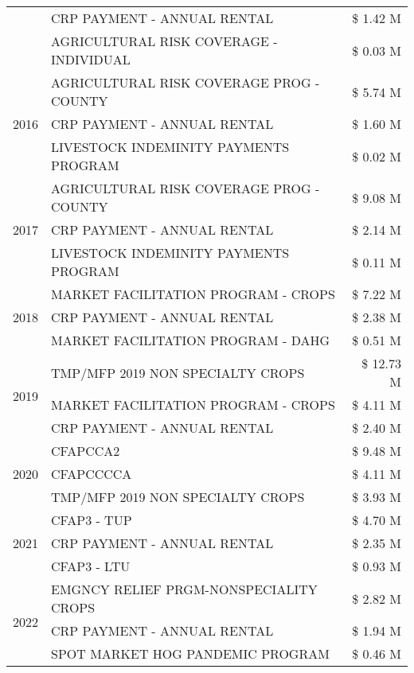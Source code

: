 \begin{tabular}{llr}
 & CRP PAYMENT - ANNUAL RENTAL & \$ 1.42 M \\
 & AGRICULTURAL RISK COVERAGE - INDIVIDUAL & \$ 0.03 M \\
\cline{1-3}
\multirow[t]{3}{*}{2016} & AGRICULTURAL RISK COVERAGE PROG - COUNTY & \$ 5.74 M \\
 & CRP PAYMENT - ANNUAL RENTAL & \$ 1.60 M \\
 & LIVESTOCK INDEMINITY PAYMENTS PROGRAM & \$ 0.02 M \\
\cline{1-3}
\multirow[t]{3}{*}{2017} & AGRICULTURAL RISK COVERAGE PROG - COUNTY & \$ 9.08 M \\
 & CRP PAYMENT - ANNUAL RENTAL & \$ 2.14 M \\
 & LIVESTOCK INDEMINITY PAYMENTS PROGRAM & \$ 0.11 M \\
\cline{1-3}
\multirow[t]{3}{*}{2018} & MARKET FACILITATION PROGRAM - CROPS & \$ 7.22 M \\
 & CRP PAYMENT - ANNUAL RENTAL & \$ 2.38 M \\
 & MARKET FACILITATION PROGRAM - DAHG & \$ 0.51 M \\
\cline{1-3}
\multirow[t]{3}{*}{2019} & TMP/MFP 2019 NON SPECIALTY CROPS & \$ 12.73 M \\
 & MARKET FACILITATION PROGRAM - CROPS & \$ 4.11 M \\
 & CRP PAYMENT - ANNUAL RENTAL & \$ 2.40 M \\
\cline{1-3}
\multirow[t]{3}{*}{2020} & CFAPCCA2 & \$ 9.48 M \\
 & CFAPCCCCA & \$ 4.11 M \\
 & TMP/MFP 2019 NON SPECIALTY CROPS & \$ 3.93 M \\
\cline{1-3}
\multirow[t]{3}{*}{2021} & CFAP3 - TUP & \$ 4.70 M \\
 & CRP PAYMENT - ANNUAL RENTAL & \$ 2.35 M \\
 & CFAP3 - LTU & \$ 0.93 M \\
\cline{1-3}
\multirow[t]{3}{*}{2022} & EMGNCY RELIEF PRGM-NONSPECIALITY CROPS & \$ 2.82 M \\
 & CRP PAYMENT - ANNUAL RENTAL & \$ 1.94 M \\
 & SPOT MARKET HOG PANDEMIC PROGRAM & \$ 0.46 M \\
\cline{1-3}
\bottomrule
\end{tabular}
